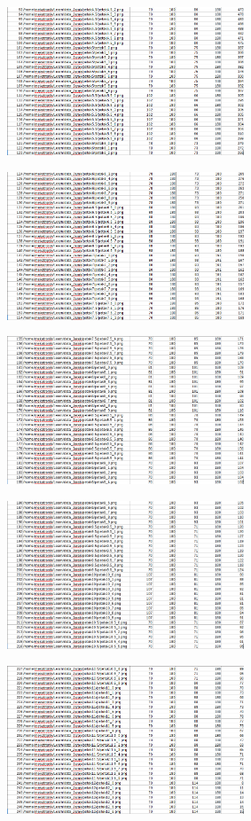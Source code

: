 \documentclass[10pt,journal,compsoc]{IEEEtran}
\begin{document}
  \begin{center}
    \includegraphics[width=200pt]{data_jarak4}
  \end{center}
  \begin{center}
    \includegraphics[width=200pt]{data_jarak5}
  \end{center}
  \begin{center}
    \includegraphics[width=200pt]{data_jarak6}
  \end{center}
  \begin{center}
    \includegraphics[width=200pt]{data_jarak7}
  \end{center}
  \begin{center}
    \includegraphics[width=200pt]{data_jarak8}
  \end{center}
\end{document}
